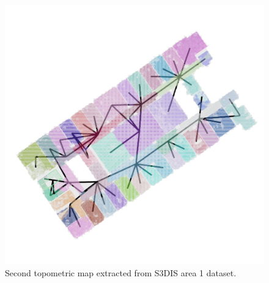 \begin{figure}[h]
    \centering
    \includegraphics*[width=\textwidth]{./fig/area_1_global.jpg}
    \caption{Second topometric map extracted from S3DIS area 1 dataset.}
    \label{fig:area_1_global}
\end{figure}
